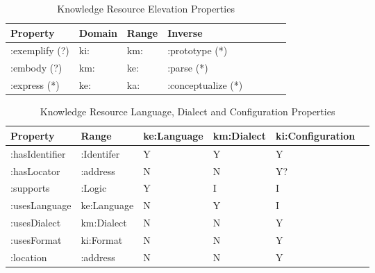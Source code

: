 \documentclass[runningheads]{llncs}
\begin{document}
\begin{table}[h]
\begin{tabular}{|l|l|l|l|l|l|l|l|}
\hline
\textbf{Property}  &\textbf{Domain}  & \textbf{Range}  & \textbf{Inverse}      
\\ \hline
:exemplify (?)   & ki:        & km:     & :prototype (*)         \\ \hline
:embody (?)      & km:        & ke:     & :parse (*)             \\ \hline
:express (*)     & ke:        & ka:     & :conceptualize (*)     \\ \hline
\end{tabular}
\caption{Knowledge Resource Elevation Properties}
\label{krelevate}
\end{table}

\begin{table}[h]
\centering
\begin{tabular}{|l|l|l|l|l|l|}
 \hline
\textbf{Property} & \textbf{Range} & \textbf{ke:Language} & \textbf{km:Dialect}  & \textbf{ki:Configuration} \\ \hline
:hasIdentifier    & :Identifer     & Y                    & Y                   & Y                       \\ \hline
:hasLocator       & :address       & N                    & N                   & Y?                        \\ \hline
:supports         & :Logic         & Y                    & I                   & I                         \\ \hline
:usesLanguage     & ke:Language    & N                    & Y                   & I                         \\ \hline
:usesDialect      & km:Dialect     & N                    & N                   & Y                         \\ \hline
:usesFormat       & ki:Format     & N                    & N                   & Y                         \\ \hline
:location         & :address       & N                    & N                   & Y       \\ \hline                  
\end{tabular}
\caption{Knowledge Resource Language, Dialect and Configuration Properties}
\label{krlang}
\end{table}
\end{document}

